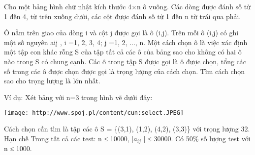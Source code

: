 Cho một bảng hình chữ nhật kích thước 4×n ô vuông. Các dòng được đánh số từ 1 đến 4, từ trên xuống dưới, các cột được đánh số từ 1 đến n từ trái qua phải.

Ô nằm trên giao của dòng i và cột j được gọi là ô (i,j). Trên mỗi ô (i,j) có ghi một số nguyên aij , i =1, 2, 3, 4; j =1, 2, ..., n. Một cách chọn ô là việc xác định một tập con khác rỗng S của tập tất cả các ô của bảng sao cho không có hai ô nào trong S có chung cạnh. Các ô trong tập S được gọi là ô được chọn, tổng các số trong các ô được chọn được gọi là trọng lượng của cách chọn. Tìm cách chọn sao cho trọng lượng là lớn nhất.

Ví dụ: Xét bảng với n=3 trong hình vẽ dưới đây:


\texttt{[image: http://www.spoj.pl/content/cun:select.JPEG]}

Cách chọn cần tìm là tập các ô S = \{(3,1), (1,2), (4,2), (3,3)\} với trọng lượng 32.
Hạn chế
Trong tất cả các test: n ≤ 10000, |$a_{ij}$ | ≤ 30000. Có 50\% số lượng test với n ≤ 1000.